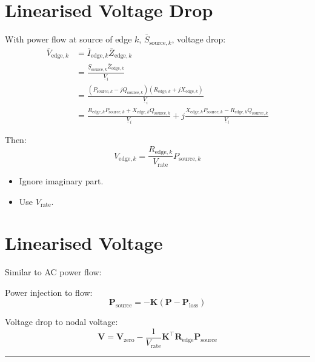 \documentclass[
]{book}
\providecommand{\tightlist}{%
  \setlength{\itemsep}{0pt}\setlength{\parskip}{0pt}}
\begin{document}
\hypertarget{linearVoltageDrop}{%
\section{Linearised Voltage Drop}\label{linearVoltageDrop}}

With power flow at source of edge \(k\), \(\bar{S}_{\text{source}, k}\), voltage
drop:
\[
\begin{aligned}
  \bar{V}_{\text{edge}, k}
  &= \bar{I}_{\text{edge}, k} \bar{Z}_{\text{edge}, k} \\
  &= \frac{
    \underline{S}_{\text{source}, k} \bar{Z}_{\text{edge}, k}
  }{\underline{V}_i} \\
  &= \frac{
    \left(P_{\text{source}, k} - j Q_{\text{source}, k} \right)
    \left(R_{\text{edge}, k} + j X_{\text{edge}, k} \right)
  }{\underline{V}_i} \\
  &= \frac{
    R_{\text{edge}, k} P_{\text{source}, k}
    + X_{\text{edge}, k} Q_{\text{source}, k}
  }{\underline{V}_i}
  + j \frac{
    X_{\text{edge}, k} P_{\text{source}, k}
    - R_{\text{edge}, k} Q_{\text{source}, k}
  }{\underline{V}_i}
\end{aligned}
\]

Then: \citep{conti2006voltage}
\[
V_{\text{edge}, k} =
  \frac{R_{\text{edge}, k}}{V_\text{rate}} P_{\text{source}, k}
\]

\begin{itemize}
\tightlist
\item
  Ignore imaginary part.
\item
  Use \(V_\text{rate}\).
\end{itemize}

\hypertarget{linearVoltage}{%
\section{Linearised Voltage}\label{linearVoltage}}

Similar to AC power flow:

Power injection to flow:
\[
\boldsymbol{P}_\text{source}
  = - \boldsymbol{K}
  \left(\boldsymbol{P} - \boldsymbol{P}_\text{loss} \right)
\]

Voltage drop to nodal voltage:
\[
\boldsymbol{V}
  = \boldsymbol{V}_\text{zero}
  - \frac{1}{V_\text{rate}} \boldsymbol{K}^{\top}
  \boldsymbol{R}_\text{edge} \boldsymbol{P}_\text{source}
\]

\begin{center}\rule{0.5\linewidth}{0.5pt}\end{center}
\end{document}
